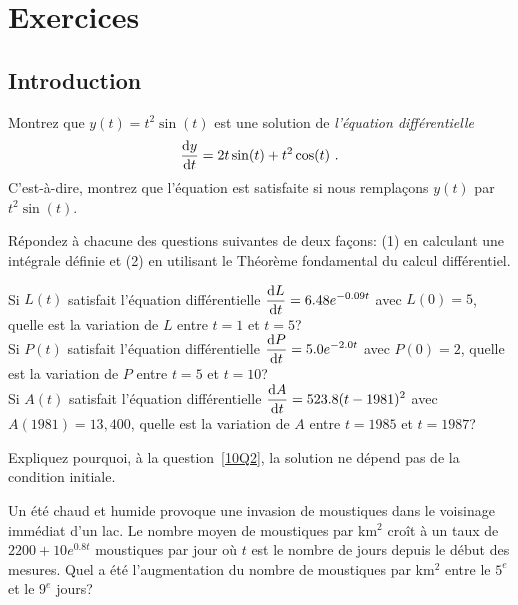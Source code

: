 \section{Exercices}

\subsection{Introduction}

\begin{question}[\eng \life]
Montrez que $y(t) = t^2\sin(t)$ est une solution de {\em l'équation
différentielle} 
\[
\dydx{y}{t} = 2t\sin(t) + t^2\cos(t) \ .
\]
C'est-à-dire, montrez que l'équation est satisfaite si nous remplaçons
$y(t)$ par $t^2\sin(t)$.
\label{10Q1}
\end{question}

\begin{question}
Répondez à chacune des questions suivantes de deux façons:  (1) en
calculant une intégrale définie et (2) en utilisant le Théorème
fondamental du calcul différentiel.

 Si $L(t)$ satisfait l'équation différentielle
$\displaystyle \frac{\mathrm{d}L}{\mathrm{d}t} = 6.48 e^{-0.09t}$ avec $L(0)=5$, quelle
est la variation de $L$ entre $t=1$ et $t=5$?\\
 Si $P(t)$ satisfait l'équation différentielle
$\displaystyle \frac{\mathrm{d}P}{\mathrm{d}t} = 5.0 e^{-2.0t}$ avec $P(0)=2$, quelle
est la variation de $P$ entre $t=5$ et $t=10$?\\
 Si $A(t)$ satisfait l'équation différentielle 
$\displaystyle \frac{\mathrm{d}A}{\mathrm{d}t} = 523.8 (t-1981)^2$ avec $A(1981) = 13,400$,
quelle est la variation de $A$ entre $t=1985$ et $t=1987$?
\label{10Q2}
\end{question}

\begin{question}
Expliquez pourquoi, à la question~\ref{10Q2}, la solution ne
dépend pas de la condition initiale.
\label{10Q3}
\end{question}

\begin{question}[\life]
Un été chaud et humide provoque une invasion de moustiques dans le
voisinage immédiat d'un lac.  Le nombre moyen de moustiques par km$^2$
croît à un taux de $2200 + 10 e^{0.8t}$ moustiques par jour où $t$ est
le nombre de jours depuis le début des mesures.  Quel a été
l'augmentation du nombre de moustiques par km$^2$ entre le $5^e$ et le
$9^e$ jours? 
\label{10Q4}
\end{question}

